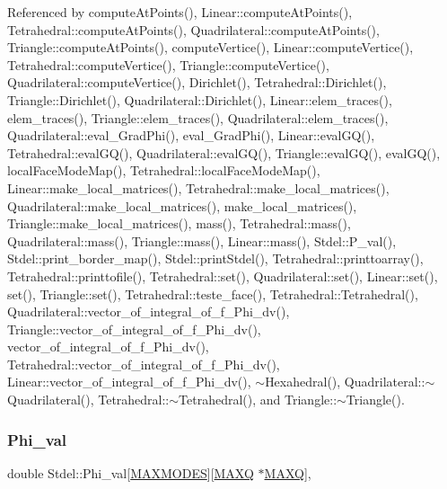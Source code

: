 Referenced by compute\+At\+Points(), Linear\+::compute\+At\+Points(), Tetrahedral\+::compute\+At\+Points(), Quadrilateral\+::compute\+At\+Points(), Triangle\+::compute\+At\+Points(), compute\+Vertice(), Linear\+::compute\+Vertice(), Tetrahedral\+::compute\+Vertice(), Triangle\+::compute\+Vertice(), Quadrilateral\+::compute\+Vertice(), Dirichlet(), Tetrahedral\+::\+Dirichlet(), Triangle\+::\+Dirichlet(), Quadrilateral\+::\+Dirichlet(), Linear\+::elem\+\_\+traces(), elem\+\_\+traces(), Triangle\+::elem\+\_\+traces(), Quadrilateral\+::elem\+\_\+traces(), Quadrilateral\+::eval\+\_\+\+Grad\+Phi(), eval\+\_\+\+Grad\+Phi(), Linear\+::eval\+G\+Q(), Tetrahedral\+::eval\+G\+Q(), Quadrilateral\+::eval\+G\+Q(), Triangle\+::eval\+G\+Q(), eval\+G\+Q(), local\+Face\+Mode\+Map(), Tetrahedral\+::local\+Face\+Mode\+Map(), Linear\+::make\+\_\+local\+\_\+matrices(), Tetrahedral\+::make\+\_\+local\+\_\+matrices(), Quadrilateral\+::make\+\_\+local\+\_\+matrices(), make\+\_\+local\+\_\+matrices(), Triangle\+::make\+\_\+local\+\_\+matrices(), mass(), Tetrahedral\+::mass(), Quadrilateral\+::mass(), Triangle\+::mass(), Linear\+::mass(), Stdel\+::\+P\+\_\+val(), Stdel\+::print\+\_\+border\+\_\+map(), Stdel\+::print\+Stdel(), Tetrahedral\+::printtoarray(), Tetrahedral\+::printtofile(), Tetrahedral\+::set(), Quadrilateral\+::set(), Linear\+::set(), set(), Triangle\+::set(), Tetrahedral\+::teste\+\_\+face(), Tetrahedral\+::\+Tetrahedral(), Quadrilateral\+::vector\+\_\+of\+\_\+integral\+\_\+of\+\_\+f\+\_\+\+Phi\+\_\+dv(), Triangle\+::vector\+\_\+of\+\_\+integral\+\_\+of\+\_\+f\+\_\+\+Phi\+\_\+dv(), vector\+\_\+of\+\_\+integral\+\_\+of\+\_\+f\+\_\+\+Phi\+\_\+dv(), Tetrahedral\+::vector\+\_\+of\+\_\+integral\+\_\+of\+\_\+f\+\_\+\+Phi\+\_\+dv(), Linear\+::vector\+\_\+of\+\_\+integral\+\_\+of\+\_\+f\+\_\+\+Phi\+\_\+dv(), $\sim$\+Hexahedral(), Quadrilateral\+::$\sim$\+Quadrilateral(), Tetrahedral\+::$\sim$\+Tetrahedral(), and Triangle\+::$\sim$\+Triangle().

\mbox{\label{classStdel_ab7849f154bd766857aac9557c19f7f84}} 
\subsubsection{\texorpdfstring{Phi\+\_\+val}{Phi\_val}}
{\footnotesize\ttfamily double Stdel\+::\+Phi\+\_\+val\mbox{[}\hyperlink{MyOptions_8h_aa75ccd382acf88cec3e9c8025c1f88b7}{M\+A\+X\+M\+O\+D\+ES}\mbox{]}\mbox{[}\hyperlink{MyOptions_8h_af708e94d886ba3f59582612949cac702}{M\+A\+XQ} $\ast$\hyperlink{MyOptions_8h_af708e94d886ba3f59582612949cac702}{M\+A\+XQ}\mbox{]}\hspace{0.3cm}{\ttfamily [protected]}, {\ttfamily [inherited]}}



